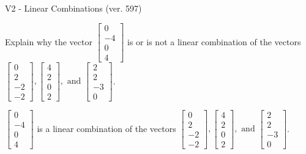 \begin{exercise}
  \begin{exerciseTitle}V2 - Linear Combinations (ver. 597)\end{exerciseTitle}
  \begin{exerciseStatement}
    Explain why the vector \(\left[\begin{array}{c}
0 \\
-4 \\
0 \\
4
\end{array}\right]\)  is or is not a linear 
	combination of the vectors \(\left[\begin{array}{c}
0 \\
2 \\
-2 \\
-2
\end{array}\right] , \left[\begin{array}{c}
4 \\
2 \\
0 \\
2
\end{array}\right] , \text{ and } \left[\begin{array}{c}
2 \\
2 \\
-3 \\
0
\end{array}\right]\).
	


  \end{exerciseStatement}
  \begin{exerciseAnswer}
   \(\left[\begin{array}{c}
0 \\
-4 \\
0 \\
4
\end{array}\right]\) 
  	 is  
	a linear combination of the vectors \(\left[\begin{array}{c}
0 \\
2 \\
-2 \\
-2
\end{array}\right] , \left[\begin{array}{c}
4 \\
2 \\
0 \\
2
\end{array}\right] , \text{ and } \left[\begin{array}{c}
2 \\
2 \\
-3 \\
0
\end{array}\right]\).

	
  


  \end{exerciseAnswer}
\end{exercise}